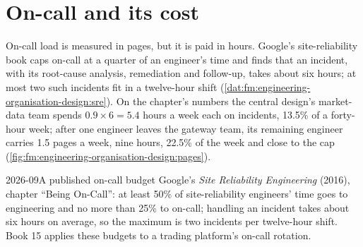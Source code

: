 \section{On-call and its cost}

On-call load is measured in pages, but it is paid in hours. Google's site-reliability book caps on-call at a quarter of an engineer's time and
finds that an incident, with its root-cause analysis, remediation and follow-up, takes about six hours; at most two such incidents fit in a
twelve-hour shift (\cref{dat:fm:engineering-organisation-design:sre}). On the chapter's numbers the central design's market-data team spends
$0.9\times6=5.4$ hours a week each on incidents, 13.5\% of a forty-hour week; after one engineer leaves the gateway team, its remaining engineer
carries 1.5 pages a week, nine hours, 22.5\% of the week and close to the cap (\cref{fig:fm:engineering-organisation-design:pages}).

\begin{dated}{2026-09}{A published on-call budget}\label{dat:fm:engineering-organisation-design:sre}
Google's \emph{Site Reliability Engineering} (2016), chapter ``Being On-Call'': at least 50\% of site-reliability engineers' time goes to
engineering and no more than 25\% to on-call; handling an incident takes about six hours on average, so the maximum is two incidents per
twelve-hour shift. Book 15 applies these budgets to a trading platform's on-call rotation.
\end{dated}

\begin{omfigure}

\label{fig:fm:engineering-organisation-design:pages}
\end{omfigure}

